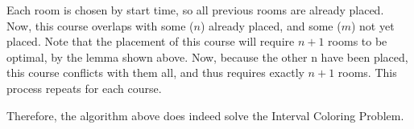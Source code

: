 \documentclass{article}
\begin{document}
\begin{enumerate}[label=\Alph*.]
	Each room is chosen by start time, so all previous rooms are already placed.
	Now, this course overlaps with some ($n$) already placed, and some ($m$) not yet placed.
	Note that the placement of this course will require $n+1$ rooms to be optimal, by the lemma shown above.
	Now, because the other n have been placed, this course conflicts with them all, and thus requires exactly $n+1$ rooms.
	This process repeats for each course.

	Therefore, the algorithm above does indeed solve the Interval Coloring Problem.
        
        
        
        
    \end{enumerate}
    
\end{document}
